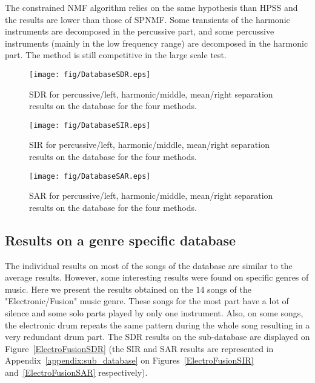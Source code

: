 The constrained NMF algorithm relies on the same hypothesis than HPSS and the results are lower than those of SPNMF. Some transients of the harmonic instruments are decomposed in the percussive part, and some percussive instruments (mainly in the low frequency range) are decomposed in the harmonic part. The method is still competitive in the large scale test. 



\begin{figure}[t]

  \centering 
  \texttt{[image: fig/DatabaseSDR.eps]}
  \caption{\label{DatabaseSDR} SDR for percussive/left, harmonic/middle, mean/right separation results on the database for the four methods.}
  
\end{figure}

\begin{figure}[t]

  \centering 
  \texttt{[image: fig/DatabaseSIR.eps]}
  \caption{\label{DatabaseSIR} SIR for percussive/left, harmonic/middle, mean/right separation results on the database for the four methods.}
  
\end{figure}

\begin{figure}[t]

  \centering 
  \texttt{[image: fig/DatabaseSAR.eps]}
  \caption{\label{DatabaseSAR} SAR for percussive/left, harmonic/middle, mean/right separation results on the database for the four methods.}
  
\end{figure}




\subsection{Results on a genre specific database}
\label{sec:subdata}

The individual results on most of the songs of the database are similar to the average results. However, some interesting results were found on specific genres of music. Here we present the results obtained on the $14$ songs of the "Electronic/Fusion" music genre. These songs for the most part have a lot of silence and some solo parts played by only one instrument. Also, on some songs, the electronic drum repeats the same pattern during the whole song resulting in a very redundant drum part. The SDR results on the sub-database are displayed on Figure~\ref{ElectroFusionSDR} (the SIR and SAR results are represented in Appendix~\ref{appendix:sub_database} on Figures~\ref{ElectroFusionSIR} and~\ref{ElectroFusionSAR} respectively). 

